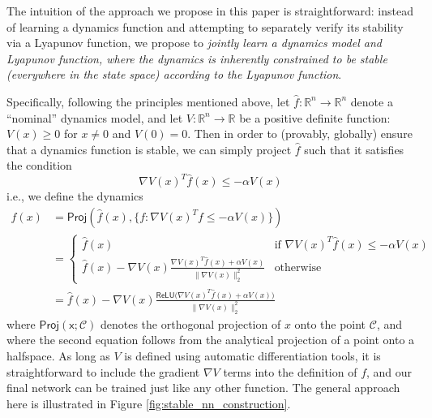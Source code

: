The intuition of the approach we propose in this paper is straightforward: instead of learning a dynamics function and attempting to separately verify its stability via a Lyapunov function, we propose to \emph{jointly learn a dynamics model and Lyapunov function, where the dynamics is inherently constrained to be stable (everywhere in the state space) according to the Lyapunov function}.

Specifically, following the principles mentioned above, let $\hat{f} : \mathbb{R}^n \rightarrow \mathbb{R}^n$ denote a ``nominal'' dynamics model, and let $V : \mathbb{R}^n \rightarrow \mathbb{R}$ be a positive definite function: $V(x) \geq 0$ for $x \neq 0$ and $V(0) = 0$.  Then in order to (provably, globally) ensure that a dynamics function is stable, we can simply project $\hat{f}$ such that it satisfies the condition
\begin{equation}
    \nabla V(x)^T \hat{f}(x) \leq -\alpha V(x)
\end{equation}
i.e., we define the dynamics
\begin{equation}
    \label{eq:dynamics}
    \begin{split}
        f(x) & =  \mathsf{Proj}\left(\hat{f}(x), \{f: \nabla V(x)^T f \leq -\alpha V(x)\}\right) \\
        & = \begin{cases} \hat{f}(x) & \mbox{if } \nabla V(x)^T \hat{f}(x) \leq -\alpha V(x) \\
              \hat{f}(x) - \nabla V(x)\frac{\nabla V(x)^T \hat{f}(x) + \alpha V (x)}{\|\nabla V(x)\|_2^2}
                         & \mbox{otherwise}\end{cases} \\
        & = \hat{f}(x) - \nabla V(x)\frac{\mathsf{ReLU}\bigl(\nabla V(x)^T \hat{f}(x) + \alpha V (x) \bigr)}{\|\nabla V(x)\|_2^2}
    \end{split}
\end{equation}
where $\mathsf{Proj(x;\mathcal{C})}$ denotes the orthogonal projection of $x$ onto the point $\mathcal{C}$, and where the second equation follows from the analytical projection of a point onto a halfspace.  As long as $V$ is defined using automatic differentiation tools, it is straightforward to include the gradient $\nabla V$ terms into the definition of $f$, and our final network can be trained just like any other function.   The general approach here is illustrated in Figure \ref{fig:stable_nn_construction}.



